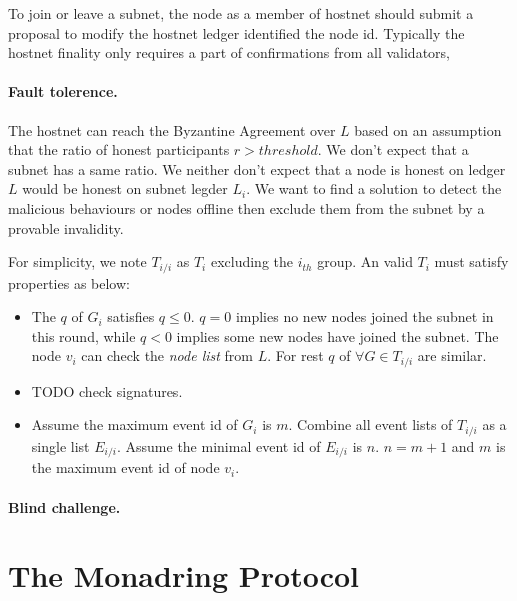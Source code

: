 \documentclass[11pt]{article}
\begin{document}
To join or leave a subnet, the node as a member of hostnet should submit a proposal to modify the hostnet ledger identified the node id.
Typically the hostnet finality only requires a part of confirmations from all validators\cite{granpd},

\paragraph{Fault tolerence.}
The hostnet can reach the Byzantine Agreement over $L$ based on an assumption that the ratio of honest participants $r > threshold$.
We don{'}t expect that a subnet has a same ratio. We neither don{'}t expect that a node is honest on ledger $L$ would be honest on subnet legder $L_{i}$.
We want to find a solution to detect the malicious behaviours or nodes offline then exclude them from the subnet by a provable invalidity.

For simplicity, we note $T_{i/i}$ as $T_{i}$ excluding the $i_{th}$ group. An valid $T_{i}$ must satisfy properties as below:

\begin{itemize}
\item The $q$ of $G_{i}$ satisfies \(q \leq 0\). $q=0$ implies no new nodes joined the subnet in this round, while $q < 0$ implies some new nodes have joined the subnet. The node $v_{i}$ can check the \textit{node list} from $L$.
For rest $q$ of $\forall G \in T_{i/i}$ are similar.
\item TODO check signatures.
\item Assume the maximum event id of $G_{i}$ is $m$. Combine all event lists of $T_{i/i}$ as a single list $E_{i/i}$. Assume the minimal event id of $E_{i/i}$ is $n$.
\(n = m+1\) and $m$ is the maximum event id of node $v_{i}$.
\end{itemize}


\paragraph{Blind challenge.} %

\section{The Monadring Protocol}


\end{document}
